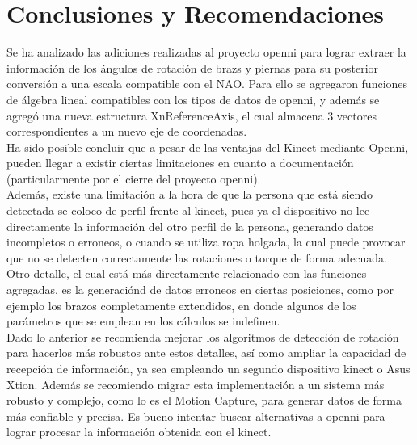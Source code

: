 \documentclass[letterpaper]{article}
\begin{document}
\section{Conclusiones y Recomendaciones}
Se ha analizado las adiciones realizadas al proyecto openni para lograr extraer la información de los ángulos de rotación de brazs y piernas para su posterior conversión a una escala compatible con el NAO. Para ello se agregaron funciones de álgebra lineal compatibles con los tipos de datos de  openni, y además se  agregó una nueva estructura XnReferenceAxis, el cual almacena 3 vectores  correspondientes a un nuevo eje de coordenadas. \\

Ha sido posible concluir que a pesar de las ventajas del Kinect mediante Openni,  pueden llegar a existir ciertas limitaciones en cuanto a documentación (particularmente por el cierre del proyecto openni).\\

Además, existe una limitación a la hora de que la persona que está siendo detectada se coloco de perfil frente al kinect, pues ya el dispositivo no lee directamente la información del otro perfil de la persona, generando datos incompletos o erroneos, o cuando se utiliza ropa holgada, la cual puede  provocar que no se detecten correctamente las rotaciones o torque de forma  adecuada. Otro detalle, el cual  está más directamente relacionado con las funciones agregadas, es la  generaciónd de datos erroneos  en ciertas posiciones, como por ejemplo los brazos completamente extendidos,  en donde algunos de los parámetros  que se emplean  en los cálculos se  indefinen.\\

Dado lo anterior  se recomienda mejorar los algoritmos de detección de rotación para hacerlos más robustos ante estos  detalles, así como ampliar la capacidad de recepción de información, ya sea empleando un segundo dispositivo kinect o Asus Xtion. Además se  recomiendo migrar esta implementación a un sistema más robusto y complejo, como lo es el Motion Capture, para generar datos de forma más confiable y precisa. Es bueno intentar buscar alternativas a openni para  lograr procesar la información obtenida con el kinect.



\end{document}
